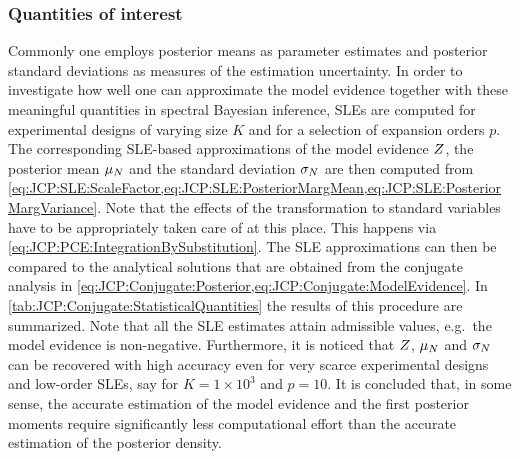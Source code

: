 \subsubsection{Quantities of interest}
Commonly one employs posterior means as parameter estimates and posterior standard deviations as measures of the estimation uncertainty.
In order to investigate how well one can approximate the model evidence together with these meaningful quantities in spectral Bayesian inference,
SLEs are computed for experimental designs of varying size \(K\) and for a selection of expansion orders \(p\).
The corresponding SLE-based approximations of the model evidence \(Z\), the posterior mean \(\mu_N\) and the standard deviation \(\sigma_N\)
are then computed from \cref{eq:JCP:SLE:ScaleFactor,eq:JCP:SLE:PosteriorMargMean,eq:JCP:SLE:PosteriorMargVariance}.
Note that the effects of the transformation to standard variables have to be appropriately taken care of at this place.
This happens via \cref{eq:JCP:PCE:IntegrationBySubstitution}.
The SLE approximations can then be compared to the analytical solutions that are obtained from the conjugate analysis in \cref{eq:JCP:Conjugate:Posterior,eq:JCP:Conjugate:ModelEvidence}.
In \cref{tab:JCP:Conjugate:StatisticalQuantities} the results of this procedure are summarized.
Note that all the SLE estimates attain admissible values, e.g.\ the model evidence is non-negative.
Furthermore, it is noticed that \(Z\), \(\mu_N\) and \(\sigma_N\) can be recovered with high accuracy even for very scarce experimental designs and low-order SLEs,
say for \(K = 1 \times 10^3\) and \(p = 10\).
It is concluded that, in some sense, the accurate estimation of the model evidence and the first posterior moments
require significantly less computational effort than the accurate estimation of the posterior density.

